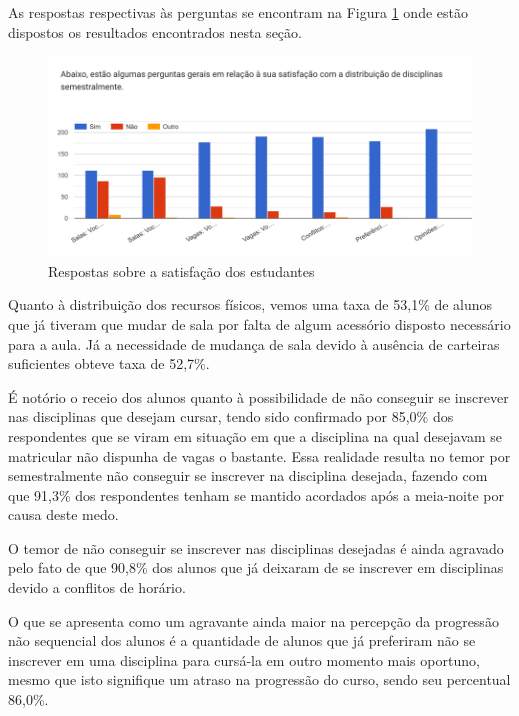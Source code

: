         As respostas respectivas às perguntas se encontram na Figura \ref{fig:3.0_Satisfacao} onde estão dispostos os resultados encontrados nesta seção.

        \begin{figure}[htbp]\centering
            \caption{\label{fig:3.0_Satisfacao}Respostas sobre a satisfação dos estudantes}
            \includegraphics[scale=0.8]{files/img/Forms/3.0-Satisfacao.png}
        \end{figure} %
        
        Quanto à distribuição dos recursos físicos, vemos uma taxa de 53,1\% de alunos que já tiveram que mudar de sala por falta de algum acessório disposto necessário para a aula. Já a necessidade de mudança de sala devido à ausência de carteiras suficientes obteve taxa de 52,7\%.

        É notório o receio dos alunos quanto à possibilidade de não conseguir se inscrever nas disciplinas que desejam cursar, tendo sido confirmado por 85,0\% dos respondentes que se viram em situação em que a disciplina na qual desejavam se matricular não dispunha de vagas o bastante. Essa realidade resulta no temor por semestralmente não conseguir se inscrever na disciplina desejada, fazendo com que 91,3\% dos respondentes tenham se mantido acordados após a meia-noite por causa deste medo.

        O temor de não conseguir se inscrever nas disciplinas desejadas é ainda agravado pelo fato de que 90,8\% dos alunos que já deixaram de se inscrever em disciplinas devido a conflitos de horário.

        O que se apresenta como um agravante ainda maior na percepção da progressão não sequencial dos alunos é a quantidade de alunos que já preferiram não se inscrever em uma disciplina para cursá-la em outro momento mais oportuno, mesmo que isto signifique um atraso na progressão do curso, sendo seu percentual 86,0\%.

